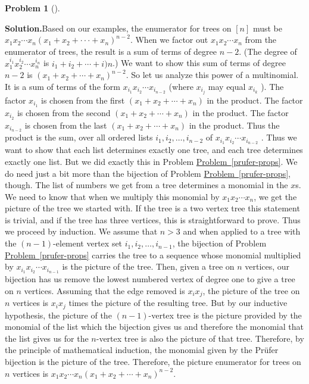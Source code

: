 \documentclass[10pt,]{book}
\theoremstyle{plain}
\theoremstyle{definition}
\newtheorem{activity}[project]{Problem}
\theoremstyle{definition}
\numberwithin{equation}{chapter}
\begin{document}
\begin{activity}[]
\begin{enumerate}[font=\bfseries,label=(\alph*),ref=\alph*]
\textbf{Solution.}\quad Based on our examples, the enumerator for trees on \([n]\) must be \(x_1x_2 \cdots x_n(x_1 + x_2 + ··· + x_n)^{n-2}\). When we factor out \(x_1x_2 \cdots x_n\) from the enumerator of trees, the result is a sum of terms of degree \(n - 2\). (The degree of \(x_1^{i_1}x_2^{i_2}\cdots x_n^{i_n}\) is \(i_1 +i_2 +\cdots+i)n\).) We want to show this sum of terms of degree \(n-2\) is \((x_1 +x_2 +\cdots+x_n)^{n-2}\). So let us analyze this power of a multinomial. It is a sum of terms of the form \(x_{i_1}x_{i_2} \cdots x_{i_{n-2}}\) (where \(x_{i_j}\) may equal \(x_{i_k}\) ). The factor \(x_{i_1}\) is chosen from the first \((x_1 +x_2 +\cdots +x_n)\) in the product. The factor \(x_{i_2}\) is chosen from the second \((x_1 + x_2 + \cdots+ x_n)\) in the product. The factor \(x_{i_{n-2}}\) is chosen from the last \((x_1 +x_2 +\cdots +x_n)\) in the product. Thus the product is the sum, over all ordered lists \(i_1,i_2,\dots ,i_{n-2}\) of \(x_{i_1} x_{i_2} \cdots x_{i_{n-2}}\) . Thus we want to show that each list determines exactly one tree, and each tree determines exactly one list. But we did exactly this in Problem \hyperref[prufer-props]{Problem~\ref{prufer-props}}. We do need just a bit more than the bijection of Problem \hyperref[prufer-props]{Problem~\ref{prufer-props}}, though. The list of numbers we get from a tree determines a monomial in the \(x\)s. We need to know that when we multiply this monomial by \(x_1x_2 \cdots x_n\), we get the picture of the tree we started with. If the tree is a two vertex tree this statement is trivial, and if the tree has three vertices, this is straightforward to prove. Thus we proceed by induction. We assume that \(n > 3\) and when applied to a tree with the \((n-1)\)-element vertex set \(i_1, i_2, \dots, i_{n-1}\), the bijection of Problem \hyperref[prufer-props]{Problem~\ref{prufer-props}} carries the tree to a sequence whose monomial multiplied by \(x_{i_1} x_{i_2}\cdots x_{i_{n-1}}\) is the picture of the tree. Then, given a tree on \(n\) vertices, our bijection has us remove the lowest numbered vertex of degree one to give a tree on \(n\) vertices. Assuming that the edge removed is \(x_ix_j\), the picture of the tree on \(n\) vertices is \(x_ix_j\) times the picture of the resulting tree. But by our inductive hypothesis, the picture of the \((n - 1)\)-vertex tree is the picture provided by the monomial of the list which the bijection gives us and therefore the monomial that the list gives us for the \(n\)-vertex tree is also the picture of that tree. Therefore, by the principle of mathematical induction, the monomial given by the Prüfer bijection is the picture of the tree. Therefore, the picture enumerator for trees on \(n\) vertices is \(x_1x_2 \cdots x_n(x_1 + x_2 + \cdots + x_n )^{n-2}\).%

\end{enumerate}
\end{activity}
\end{document}

